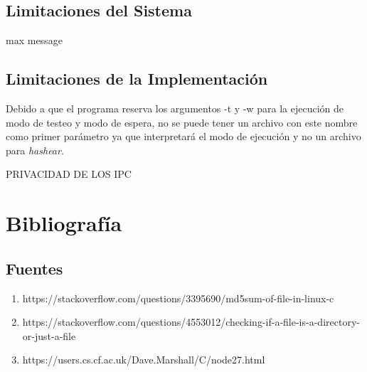 \documentclass[10pt,a4paper]{report}
\begin{document}
\section{Limitaciones del Sistema}
max message

\section{Limitaciones de la Implementación}
Debido a que el programa reserva los argumentos -t y -w para la ejecución de modo de testeo y modo de espera, no se puede tener un archivo con este nombre como primer parámetro ya que interpretará el modo de ejecución y no un archivo para \textit{hashear}.

PRIVACIDAD DE LOS IPC


\chapter{Bibliografía}
\section{Fuentes}
\begin{enumerate}
\item https://stackoverflow.com/questions/3395690/md5sum-of-file-in-linux-c
\item https://stackoverflow.com/questions/4553012/checking-if-a-file-is-a-directory-or-just-a-file
\item https://users.cs.cf.ac.uk/Dave.Marshall/C/node27.html
\end{enumerate}
\end{document}
